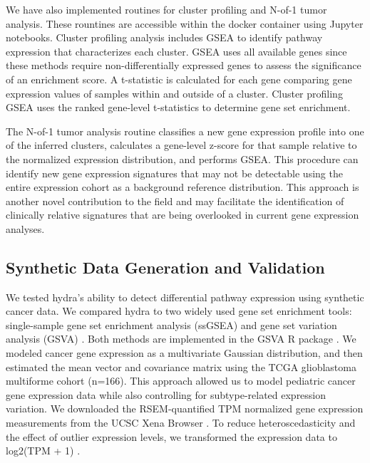 \documentclass[10pt,letterpaper]{article}
\begin{document}
We have also implemented routines for cluster profiling and N-of-1 tumor analysis. These rountines are accessible within the docker container using Jupyter notebooks. Cluster profiling analysis includes GSEA to identify pathway expression that characterizes each cluster. GSEA uses all available genes since these methods require non-differentially expressed genes to assess the significance of an enrichment score. A t-statistic is calculated for each gene comparing gene expression values of samples within and outside of a cluster. Cluster profiling GSEA uses the ranked gene-level t-statistics to determine gene set enrichment. 

The N-of-1 tumor analysis routine classifies a new gene expression profile into one of the inferred clusters, calculates a gene-level z-score for that sample relative to the normalized expression distribution, and performs GSEA. This procedure can identify new gene expression signatures that may not be detectable using the entire expression cohort as a background reference distribution. This approach is another novel contribution to the field and may facilitate the identification of clinically relative signatures that are being overlooked in current gene expression analyses.

\subsection*{Synthetic Data Generation and Validation}
We tested hydra's ability to detect differential pathway expression using synthetic cancer data. We compared hydra to two widely used gene set enrichment tools: single-sample gene set enrichment analysis (ssGSEA) and gene set variation analysis (GSVA) \cite{barbieSystematicRNAInterference2009, hanzelmannGSVAGeneSet2013, tarcaComparisonGeneSet2013}. Both methods are implemented in the GSVA R package \cite{hanzelmannGSVAGeneSet2013}. We modeled cancer gene expression as a multivariate Gaussian distribution, and then estimated the mean vector and covariance matrix using the TCGA glioblastoma multiforme cohort (n=166). This approach allowed us to model pediatric cancer gene expression data while also controlling for subtype-related expression variation. We downloaded the RSEM-quantified TPM normalized gene expression measurements from the UCSC Xena Browser \cite{goldmanUCSCXenaPlatform2018}. To reduce heteroscedasticity and the effect of outlier expression levels, we transformed the expression data to log2(TPM + 1) \cite{zwienerTransformingRNASeqData2014}.
 
\end{document}
